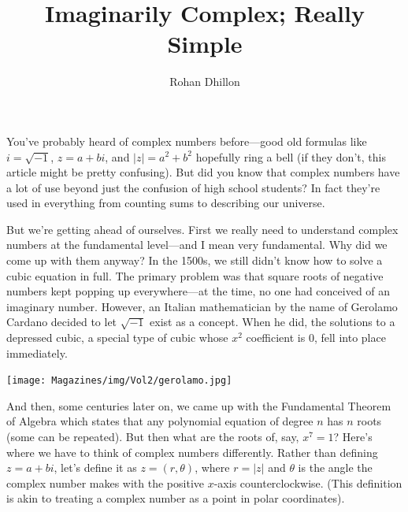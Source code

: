 \documentclass{article}
\title{Imaginarily Complex; Really Simple}
\author{Rohan Dhillon}
\begin{document}
\maketitle
You’ve probably heard of complex numbers before—good old formulas like $i=\sqrt{-1}$, $z=a+bi$, and $|z|=a^2+b^2$ hopefully ring a bell (if they don’t, this article might be pretty confusing). But did you know that complex numbers have a lot of use beyond just the confusion of high school students? In fact they’re used in everything from counting sums to describing our universe. 

But we’re getting ahead of ourselves. First we really need to understand complex numbers at the fundamental level—and I mean very fundamental. Why did we come up with them anyway? In the 1500s, we still didn’t know how to solve a cubic equation in full. The primary problem was that square roots of negative numbers kept popping up everywhere—at the time, no one had conceived of an imaginary number. However, an Italian mathematician by the name of Gerolamo Cardano decided to let $\sqrt{-1}$ exist as a concept. When he did, the solutions to a depressed cubic, a special type of cubic whose $x^2$ coefficient is $0$, fell into place immediately. 
\begin{center}
    \texttt{[image: Magazines/img/Vol2/gerolamo.jpg]}
\end{center}
And then, some centuries later on, we came up with the Fundamental Theorem of Algebra which states that any polynomial equation of degree $n$ has $n$ roots (some can be repeated). But then what are the roots of, say, $x^7=1$? Here’s where we have to think of complex numbers differently. Rather than defining $z=a+bi$, let’s define it as $z=(r,\theta)$, where $r=|z|$ and $\theta$  is the angle the complex number makes with the positive $x$-axis counterclockwise. (This definition is akin to treating a complex number as a point in polar coordinates). 
\end{document}
